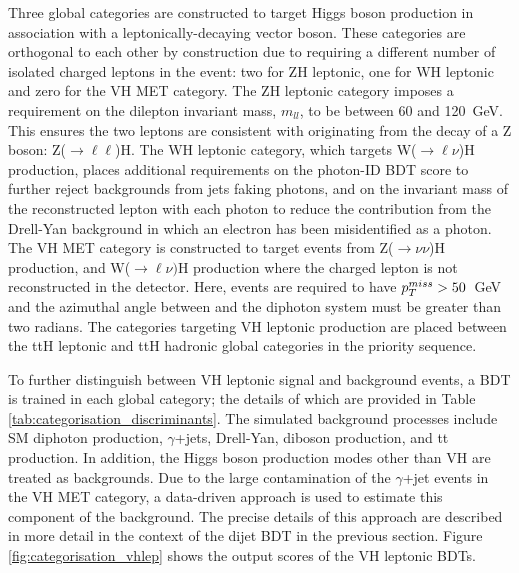 Three global categories are constructed to target Higgs boson production in association with a leptonically-decaying vector boson. These categories are orthogonal to each other by construction due to requiring a different number of isolated charged leptons in the event: two for ZH leptonic, one for WH leptonic and zero for the VH MET category. The ZH leptonic category imposes a requirement on the dilepton invariant mass, $m_{ll}$, to be between 60 and 120~GeV. This ensures the two leptons are consistent with originating from the decay of a Z boson: Z($\rightarrow\ell\ell$)H. The WH leptonic category, which targets W($\rightarrow\ell\nu$)H production, places additional requirements on the photon-ID BDT score to further reject backgrounds from jets faking photons, and on the invariant mass of the reconstructed lepton with each photon to reduce the contribution from the Drell-Yan background in which an electron has been misidentified as a photon. The VH MET category is constructed to target events from Z($\rightarrow\nu\nu$)H production, and W($\rightarrow\ell\nu)$H production where the charged lepton is not reconstructed in the detector. Here, events are required to have $p^{miss}_{T}>50$~GeV and the azimuthal angle between \metv and the diphoton system must be greater than two radians. The categories targeting VH leptonic production are placed between the ttH leptonic and ttH hadronic global categories in the priority sequence.

To further distinguish between VH leptonic signal and background events, a BDT is trained in each global category; the details of which are provided in Table \ref{tab:categorisation_discriminants}. The simulated background processes include SM diphoton production, $\gamma$+jets, Drell-Yan, diboson production, and tt production. In addition, the Higgs boson production modes other than VH are treated as backgrounds. Due to the large contamination of the $\gamma$+jet events in the VH MET category, a data-driven approach is used to estimate this component of the background. The precise details of this approach are described in more detail in the context of the dijet BDT in the previous section. Figure \ref{fig:categorisation_vhlep} shows the output scores of the VH leptonic BDTs.

